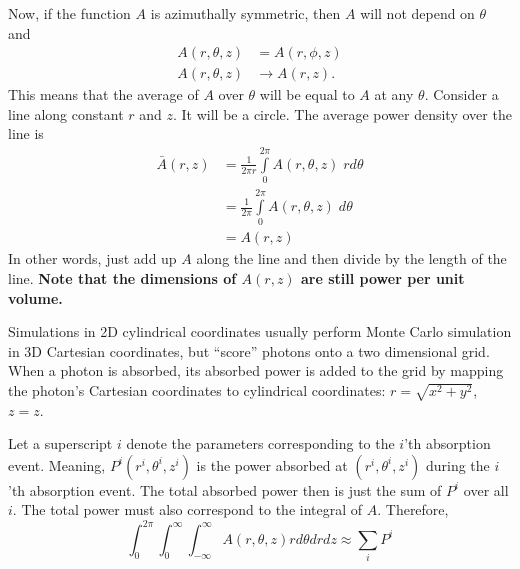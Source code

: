\documentclass[letterpaper,12pt]{article}
\begin{document}
Now, if the function $A$ is azimuthally symmetric, then $A$ will not depend on $\theta$ and
\begin{align*}
  A(r,\theta,z) &= A(r,\phi,z) \\
  A(r,\theta,z) &\rightarrow A(r,z).
\end{align*}
This means that the average of $A$ over $\theta$ will be equal to $A$ at any $\theta$. Consider a line along constant $r$ and $z$. It will be a circle. The average power density over the line is
\begin{align}
  \label{eq:avg_A}
  \bar{A}(r,z) &= \frac{1}{2\pi r} \int\limits_0^{2\pi}  A(r,\theta,z) \; r d\theta \nonumber \\
               &= \frac{1}{2\pi} \int\limits_0^{2\pi}  A(r,\theta,z) \; d\theta \nonumber \\
               &= A(r,z)
\end{align}
In other words, just add up $A$ along the line and then divide by the length of the line.
\textbf{Note that the dimensions of $A(r,z)$ are still power per unit volume.}

Simulations in 2D cylindrical coordinates usually perform Monte Carlo
simulation in 3D Cartesian coordinates, but ``score'' photons onto a two
dimensional grid. When a photon is absorbed, its absorbed power is added to
the grid by mapping the photon's Cartesian coordinates to cylindrical
coordinates: $r = \sqrt{x^2 + y^2}$, $z = z$. 

Let a superscript $i$ denote the parameters corresponding to the $i$'th absorption event. Meaning, $P^i(r^i,\theta^i,z^i)$ is the power absorbed
at $(r^i,\theta^i,z^i)$ during the $i$'th absorption event. The total absorbed power then is just the sum of $P^i$ over all $i$. The total power
must also correspond to the integral of $A$. Therefore,
\begin{equation}
  \int_{0}^{2\pi}
  \int_{0}^{\infty}
  \int_{-\infty}^{\infty}
  A(r,\theta,z)
  r d\theta
  d r
  d z \approx \sum_i P^i
\end{equation}
\end{document}
